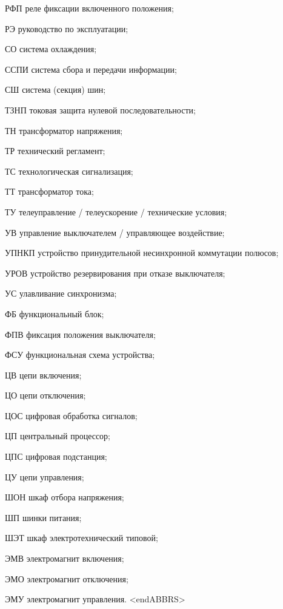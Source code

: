 \begin{list}{}
\item[РФП] реле фиксации включенного положения;
\item[РЭ] руководство по эксплуатации;
\item[СО] система охлаждения;
\item[ССПИ] система сбора и передачи информации;
\item[СШ] система (секция) шин;
\item[ТЗНП] токовая защита нулевой последовательности;
\item[ТН] трансформатор напряжения;
\item[ТР] технический регламент;
\item[ТС] технологическая сигнализация;
\item[ТТ] трансформатор тока;
\item[ТУ] телеуправление / телеускорение / технические условия;
\item[УВ] управление выключателем / управляющее воздействие;
\item[УПНКП] устройство принудительной несинхронной коммутации полюсов;
\item[УРОВ] устройство резервирования при отказе выключателя;
\item[УС] улавливание синхронизма;
\item[ФБ] функциональный блок;
\item[ФПВ] фиксация положения выключателя;
\item[ФСУ] функциональная схема устройства;
\item[ЦВ] цепи включения;
\item[ЦО] цепи отключения;
\item[ЦОС] цифровая обработка сигналов;
\item[ЦП] центральный процессор;
\item[ЦПС] цифровая подстанция;
\item[ЦУ] цепи управления;
\item[ШОН] шкаф отбора напряжения;
\item[ШП] шинки питания;
\item[ШЭТ] шкаф электротехнический типовой;
\item[ЭМВ] электромагнит включения;
\item[ЭМО] электромагнит отключения;
\item[ЭМУ] электромагнит управления.
{\color{white}\fontsize{0.1pt}{0.1pt}\selectfont<endABBRS>}
\end{list}
